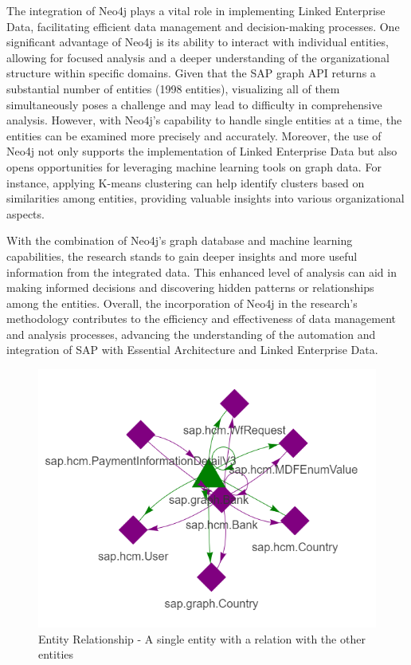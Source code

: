 \documentclass{article}
\begin{document}
The integration of Neo4j plays a vital role in implementing Linked Enterprise Data, facilitating efficient data management and decision-making processes. One significant advantage of Neo4j is its ability to interact with individual entities, allowing for focused analysis and a deeper understanding of the organizational structure within specific domains. Given that the SAP graph API returns a substantial number of entities (1998 entities), visualizing all of them simultaneously poses a challenge and may lead to difficulty in comprehensive analysis. However, with Neo4j's capability to handle single entities at a time, the entities can be examined more precisely and accurately.
Moreover, the use of Neo4j not only supports the implementation of Linked Enterprise Data but also opens opportunities for leveraging machine learning tools on graph data. For instance, applying K-means clustering can help identify clusters based on similarities among entities, providing valuable insights into various organizational aspects.

With the combination of Neo4j's graph database and machine learning capabilities, the research stands to gain deeper insights and more useful information from the integrated data. This enhanced level of analysis can aid in making informed decisions and discovering hidden patterns or relationships among the entities. Overall, the incorporation of Neo4j in the research's methodology contributes to the efficiency and effectiveness of data management and analysis processes, advancing the understanding of the automation and integration of SAP with Essential Architecture and Linked Enterprise Data. \parencite{hodler2022a}


\begin{figure}[ht!]
    \centering
    \includegraphics[scale=0.6]{graph-open-data}
    \caption{Entity Relationship - 
A single entity with a relation with the other entities}
    \label{fig:graph-open-data}
\end{figure}
\end{document}
